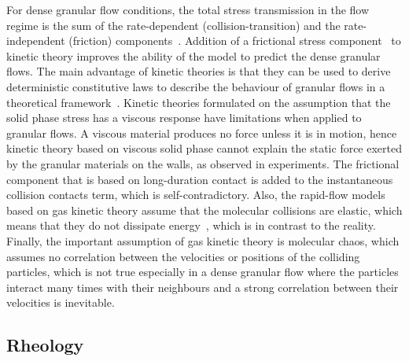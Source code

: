 For dense granular flow conditions, the total stress transmission in the flow 
regime is the sum of the rate-dependent (collision-transition) and the 
rate-independent (friction) components~\citep{Ng2008}. Addition of a frictional 
stress component~\citep{Schaeffer1987} to kinetic theory improves the 
ability of the model to predict the dense granular flows. The main advantage of 
kinetic theories is that they can be used to derive deterministic constitutive 
laws to describe the behaviour of granular flows in a theoretical 
framework~\citep{Jenkins1983}. Kinetic theories formulated on the assumption 
that the solid phase stress has a viscous response have limitations when 
applied to granular flows. A viscous material produces no force unless it is in 
motion, hence kinetic theory based on viscous solid phase cannot explain the 
static force exerted by the granular materials on the walls, as observed in 
experiments. The frictional component that is based on long-duration contact is 
added to the instantaneous collision contacts term, which is 
self-contradictory. 
Also, the rapid-flow models based on gas 
kinetic theory assume that the molecular collisions are elastic, which means 
that they do not dissipate energy~\citep{Campbell2006}, which is in contrast to 
the reality. Finally, the important assumption of gas kinetic theory is 
molecular chaos, which assumes no correlation between the velocities or 
positions of the colliding particles, which is not true especially in a dense 
granular flow where the particles interact many times with their neighbours and 
a strong correlation between their velocities is inevitable.

\subsection{Rheology}
\label{sec:muI}


